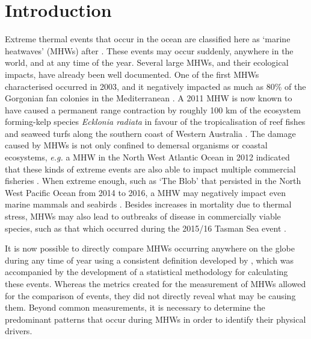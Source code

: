 \documentclass[utf8]{frontiersSCNS}
\begin{document}
\section{Introduction}
Extreme thermal events that occur in the ocean are classified here as `marine heatwaves' (MHWs) after \citet{Hobday2016}. These events may occur suddenly, anywhere in the world, and at any time of the year. Several large MHWs, and their ecological impacts, have already been well documented. One of the first MHWs characterised occurred in 2003, and it negatively impacted as much as 80\% of the Gorgonian fan colonies in the Mediterranean \citep{Garrabou2009}. A 2011 MHW is now known to have caused a permanent range contraction by roughly 100 km of the ecosystem forming-kelp species \emph{Ecklonia radiata} in favour of the tropicalisation of reef fishes and seaweed turfs along the southern coast of Western Australia \citep{Wernberg2016}. The damage caused by MHWs is not only confined to demersal organisms or coastal ecosystems, \emph{e.g.} a MHW in the North West Atlantic Ocean in 2012 indicated that these kinds of extreme events are also able to impact multiple commercial fisheries \citep{Mills2013}. When extreme enough, such as `The Blob' that persisted in the North West Pacific Ocean from 2014 to 2016, a MHW may negatively impact even marine mammals and seabirds \citep{Cavole2016}. Besides increases in mortality due to thermal stress, MHWs may also lead to outbreaks of disease in commercially viable species, such as that which occurred during the 2015/16 Tasman Sea event \citep{Oliver2017}.

It is now possible to directly compare MHWs occurring anywhere on the globe during any time of year using a consistent definition developed by \citet{Hobday2016}, which was accompanied by the development of a statistical methodology for calculating these events. Whereas the metrics created for the measurement of MHWs allowed for the comparison of events, they did not directly reveal what may be causing them. Beyond common measurements, it is necessary to determine the predominant patterns that occur during MHWs in order to identify their physical drivers.
\end{document}
